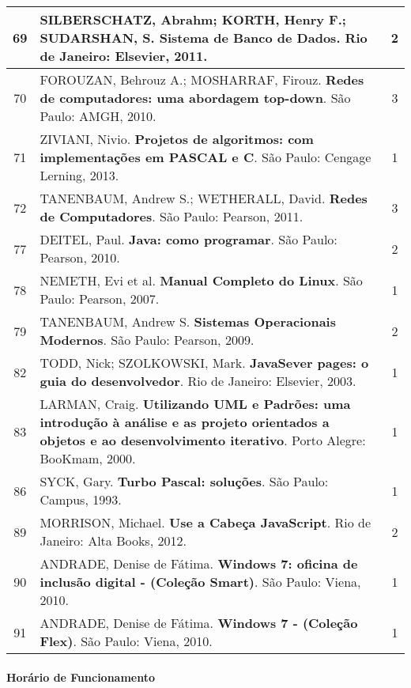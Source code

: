 \begin{longtable}{|c|p{115mm}|c|}
69     & SILBERSCHATZ, Abrahm; KORTH, Henry F.; SUDARSHAN, S. \textbf{Sistema de Banco de Dados}. Rio de Janeiro: Elsevier, 2011. & 2          \\ \hline
70     & FOROUZAN, Behrouz A.; MOSHARRAF, Firouz. \textbf{Redes de computadores: uma abordagem top-down}. São Paulo: AMGH, 2010. & 3          \\ \hline
71     & ZIVIANI, Nivio. \textbf{Projetos de algoritmos: com implementações em PASCAL e C}. São Paulo: Cengage Lerning, 2013. & 1          \\ \hline
72     & TANENBAUM, Andrew S.; WETHERALL, David. \textbf{Redes de Computadores}. São Paulo: Pearson, 2011. & 3          \\ \hline

77     & DEITEL, Paul. \textbf{Java: como programar}. São Paulo: Pearson, 2010.                & 2          \\ \hline
78     & NEMETH, Evi et al. \textbf{Manual Completo do Linux}. São Paulo: Pearson, 2007.       & 1          \\ \hline
79     & TANENBAUM, Andrew S. \textbf{Sistemas Operacionais Modernos}. São Paulo: Pearson, 2009.        & 2          \\ \hline
82     & TODD, Nick; SZOLKOWSKI, Mark. \textbf{JavaSever pages: o guia do desenvolvedor}. Rio de Janeiro: Elsevier, 2003. & 1          \\ \hline
83     & LARMAN, Craig. \textbf{Utilizando UML e Padrões: uma introdução à análise e as projeto orientados a objetos e ao desenvolvimento iterativo}. Porto Alegre: BooKmam, 2000. & 1          \\ \hline
86     & SYCK, Gary. \textbf{Turbo Pascal: soluções}. São Paulo: Campus, 1993.                          & 1          \\ \hline
89     & MORRISON, Michael. \textbf{Use a Cabeça JavaScript}. Rio de Janeiro: Alta Books, 2012.         & 2          \\ \hline
90     & ANDRADE, Denise de Fátima. \textbf{Windows 7: oficina de inclusão digital - (Coleção Smart)}. São Paulo: Viena, 2010. & 1          \\ \hline
91     & ANDRADE, Denise de Fátima. \textbf{Windows 7 - (Coleção Flex)}. São Paulo: Viena, 2010.                 & 1          \\ \hline
\end{longtable}

\paragraph{Horário de Funcionamento}\

